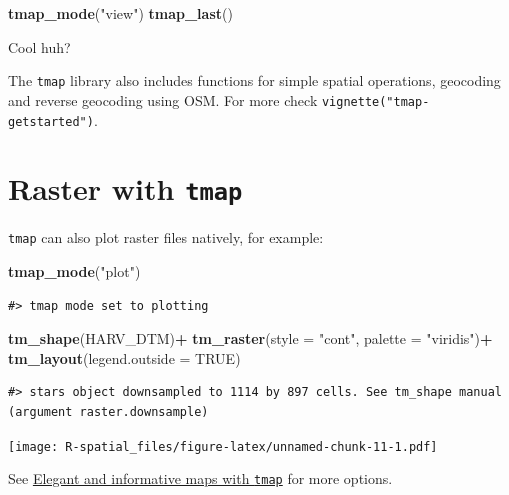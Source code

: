 \documentclass[
]{book}
\newenvironment{Shaded}{\begin{snugshade}}{\end{snugshade}}
\newcommand{\AttributeTok}[1]{\textcolor[rgb]{0.13,0.29,0.53}{#1}}
\newcommand{\ConstantTok}[1]{\textcolor[rgb]{0.56,0.35,0.01}{#1}}
\newcommand{\FunctionTok}[1]{\textcolor[rgb]{0.13,0.29,0.53}{\textbf{#1}}}
\newcommand{\NormalTok}[1]{#1}
\newcommand{\SpecialCharTok}[1]{\textcolor[rgb]{0.81,0.36,0.00}{\textbf{#1}}}
\newcommand{\StringTok}[1]{\textcolor[rgb]{0.31,0.60,0.02}{#1}}
\begin{document}
\begin{Shaded}
\begin{Highlighting}[]
\FunctionTok{tmap\_mode}\NormalTok{(}\StringTok{"view"}\NormalTok{)}
\FunctionTok{tmap\_last}\NormalTok{()}
\end{Highlighting}
\end{Shaded}

Cool huh?

The \texttt{tmap} library also includes functions for simple spatial operations, geocoding and reverse geocoding using OSM. For more check \texttt{vignette("tmap-getstarted")}.

\hypertarget{raster-with-tmap}{%
\section{\texorpdfstring{Raster with \texttt{tmap}}{Raster with tmap}}\label{raster-with-tmap}}

\texttt{tmap} can also plot raster files natively, for example:

\begin{Shaded}
\begin{Highlighting}[]
\FunctionTok{tmap\_mode}\NormalTok{(}\StringTok{"plot"}\NormalTok{)}
\end{Highlighting}
\end{Shaded}

\begin{verbatim}
#> tmap mode set to plotting
\end{verbatim}

\begin{Shaded}
\begin{Highlighting}[]
\FunctionTok{tm\_shape}\NormalTok{(HARV\_DTM)}\SpecialCharTok{+}
    \FunctionTok{tm\_raster}\NormalTok{(}\AttributeTok{style =} \StringTok{"cont"}\NormalTok{, }\AttributeTok{palette =} \StringTok{"viridis"}\NormalTok{)}\SpecialCharTok{+}
    \FunctionTok{tm\_layout}\NormalTok{(}\AttributeTok{legend.outside =} \ConstantTok{TRUE}\NormalTok{)}
\end{Highlighting}
\end{Shaded}

\begin{verbatim}
#> stars object downsampled to 1114 by 897 cells. See tm_shape manual (argument raster.downsample)
\end{verbatim}

\texttt{[image: R-spatial\_files/figure-latex/unnamed-chunk-11-1.pdf]}

See \href{https://r-tmap.github.io/tmap-book/}{Elegant and informative maps with \texttt{tmap}} for more options.
\end{document}
